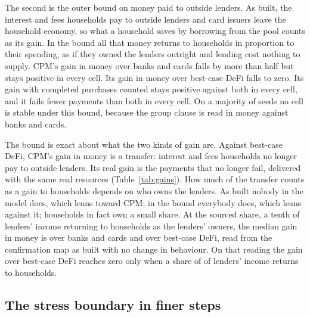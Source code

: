 The second is the outer bound on money paid to outside lenders. As built, the interest and fees households
pay to outside lenders and card issuers leave the household economy, so what a household saves by borrowing from
the pool counts as its gain. In the bound all that money returns to households in proportion to their
spending, as if they owned the lenders outright and lending cost nothing to supply. CPM's gain in money over
banks and cards falls by more than half but stays positive in every cell. Its gain in money over best-case DeFi
falls to zero. Its gain with completed purchases counted stays positive against both in every cell, and it fails
fewer payments than both in every cell. On a majority of seeds no cell is stable under this bound, because the
group clause is read in money against banks and cards.

The bound is exact about what the two kinds of gain are. Against best-case DeFi, CPM's gain in money is a
transfer: interest and fees households no longer pay to outside lenders. Its real gain is the payments that
no longer fail, delivered with the same real resources (Table~\ref{tab:gains}). How much of the transfer counts
as a gain to households depends on who owns the lenders. As built nobody in the model does, which leans toward
CPM; in the bound everybody does, which leans against it; households in fact own a small share. At the sourced
share, a tenth of lenders' income returning to households as the lenders' owners, the median gain in money is
\GainBanksShared{} over banks and cards and \GainDefiShared{} over best-case DeFi, read from the confirmation map as built with
no change in behaviour. On that reading the gain over best-case DeFi reaches zero only when a share of
\LenderShareZeroDefi{} of lenders' income returns to households.

\begin{table}[htbp]\centering\small
\resizebox{\linewidth}{!}{}
\caption{The two bound maps beside the development map, each the whole grid on the same development seeds. Gains are medians over the
cells with no distress, in dollars a person a year, in money alone and with completed purchases at their price.
Counts of cells with every gain positive and with fewer failed payments are over the whole grid; the last two
columns count cells with no distress that are stable on a majority of seeds.}
\label{tab:bounds}
\end{table}

\subsection{The stress boundary in finer steps}

